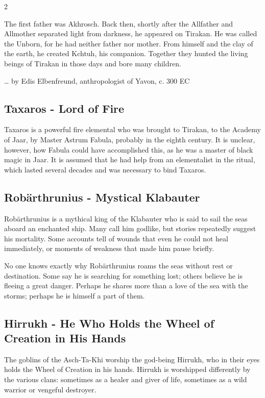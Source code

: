 \begin{multicols}{2}
{The first father was Akhrosch. Back then, shortly after the Allfather and Allmother separated light from darkness, he appeared on Tirakan. He was called the Unborn, for he had neither father nor mother. From himself and the clay of the earth, he created Kchtuh, his companion. Together they hunted the living beings of Tirakan in those days and bore many children.

\ldots{} by Edis Elbenfreund, anthropologist of Yavon, c. 300 EC

\subsection{Taxaros - Lord of Fire}\label{subsec:taxaros-herr-des-feuers}

Taxaros is a powerful fire elemental who was brought to Tirakan, to the Academy of Jaar, by Master Astrum Fabula, probably in the eighth century. It is unclear, however, how Fabula could have accomplished this, as he was a master of black magic in Jaar. It is assumed that he had help from an elementalist in the ritual, which lasted several decades and was necessary to bind Taxaros.

\subsection{Robärthrunius - Mystical Klabauter}\label{subsec:robarthrunius-mystischer-klabauter}

Robärthrunius is a mythical king of the Klabauter who is said to sail the seas aboard an enchanted ship. Many call him godlike, but stories repeatedly suggest his mortality. Some accounts tell of wounds that even he could not heal immediately, or moments of weakness that made him pause briefly.

No one knows exactly why Robärthrunius roams the seas without rest or destination. Some say he is searching for something lost; others believe he is fleeing a great danger. Perhaps he shares more than a love of the sea with the storms; perhaps he is himself a part of them.

\subsection{Hirrukh - He Who Holds the Wheel of Creation in His Hands}\label{subsec:hirrukh-der-der-das-rad-der-schopfung-in-handen-halt}

The goblins of the Asch-Ta-Khi worship the god-being Hirrukh, who in their eyes holds the Wheel of Creation in his hands. Hirrukh is worshipped differently by the various clans: sometimes as a healer and giver of life, sometimes as a wild warrior or vengeful destroyer.

}
\end{multicols}
